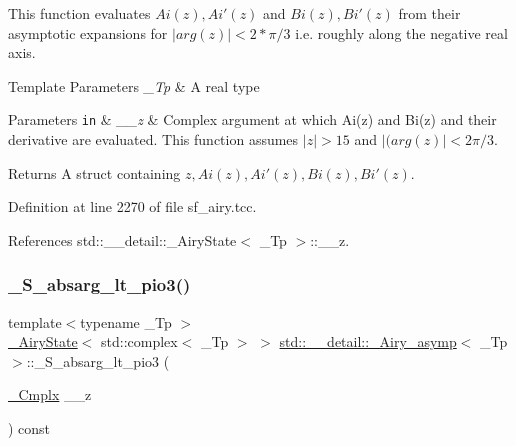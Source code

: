 This function evaluates $ Ai(z), Ai'(z) $ and $ Bi(z), Bi'(z) $ from their asymptotic expansions for $ |arg(z)| < 2*\pi/3 $ i.\+e. roughly along the negative real axis. 


\begin{DoxyTemplParams}{Template Parameters}
{\em \+\_\+\+Tp} & A real type \\
\hline
\end{DoxyTemplParams}

\begin{DoxyParams}[1]{Parameters}
\mbox{\tt in}  & {\em \+\_\+\+\_\+z} & Complex argument at which Ai(z) and Bi(z) and their derivative are evaluated. This function assumes $ |z| > 15 $ and $ |(arg(z)| < 2\pi/3 $. \\
\hline
\end{DoxyParams}
\begin{DoxyReturn}{Returns}
A struct containing $ z, Ai(z), Ai'(z), Bi(z), Bi'(z) $. 
\end{DoxyReturn}


Definition at line 2270 of file sf\+\_\+airy.\+tcc.



References std\+::\+\_\+\+\_\+detail\+::\+\_\+\+Airy\+State$<$ \+\_\+\+Tp $>$\+::\+\_\+\+\_\+z.

\mbox{\label{classstd_1_1____detail_1_1__Airy__asymp_a64bce3ed154b3268944ae20f324d64cd}} 
\subsubsection{\texorpdfstring{\+\_\+\+S\+\_\+absarg\+\_\+lt\+\_\+pio3()}{\_S\_absarg\_lt\_pio3()}}
{\footnotesize\ttfamily template$<$typename \+\_\+\+Tp $>$ \\
\hyperlink{structstd_1_1____detail_1_1__AiryState}{\+\_\+\+Airy\+State}$<$ std\+::complex$<$ \+\_\+\+Tp $>$ $>$ \hyperlink{classstd_1_1____detail_1_1__Airy__asymp}{std\+::\+\_\+\+\_\+detail\+::\+\_\+\+Airy\+\_\+asymp}$<$ \+\_\+\+Tp $>$\+::\+\_\+\+S\+\_\+absarg\+\_\+lt\+\_\+pio3 (\begin{DoxyParamCaption}\item[{\hyperlink{classstd_1_1____detail_1_1__Airy__asymp_ae28f102423d34e78502ab6da42d67f50}{\+\_\+\+Cmplx}}]{\+\_\+\+\_\+z }\end{DoxyParamCaption}) const}



